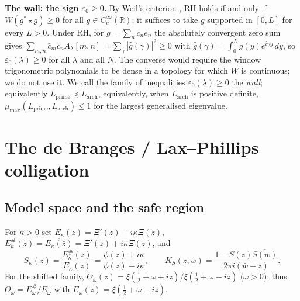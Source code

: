 \documentclass[11pt]{amsart}
\theoremstyle{definition}
\theoremstyle{remark}
\newcommand{\half}{\tfrac{1}{2}}
\newcommand{\om}{\omega}
\newcommand{\kap}{\kappa}
\newcommand{\eps}{\varepsilon}
\newcommand{\R}{\mathbb{R}}
\newcommand{\Xibar}{\Xi}
\newcommand{\Th}{\Theta}
\newcommand{\Sk}{S_\kap}
\newcommand{\Ek}{E_\kap}
\begin{document}
\medskip\noindent\textbf{The wall: the sign $\eps_0\ge0$.}
By Weil's criterion \cite{Weil,Bombieri}, RH holds if and only if $W(g^*\star g)\ge0$ for all
$g\in C_c^\infty(\R)$; it suffices to take $g$ supported in $[0,L]$ for every $L>0$. Under RH, for $g=\sum_nc_ne_n$ the absolutely convergent zero sum gives
$\sum_{m,n}\bar c_mc_nA_\lambda[m,n]=\sum_\gamma|\hat g(\gamma)|^2\ge0$ with
$\hat g(\gamma)=\int_0^Lg(y)e^{i\gamma y}\,dy$, so $\eps_0(\lambda)\ge0$ for all $\lambda$ and all $N$. The converse would require the
window trigonometric polynomials to be dense in a topology for which $W$ is continuous; we do not
use it. We call the family of inequalities $\eps_0(\lambda)\ge0$ the \emph{wall}; equivalently
$L_{\mathrm{prime}}\preceq L_{\mathrm{arch}}$, equivalently, when
$L_{\mathrm{arch}}$ is positive definite,
$\mu_{\max}(L_{\mathrm{prime}},L_{\mathrm{arch}})\le1$ for the largest generalised eigenvalue.
\medskip

\section{The de Branges / Lax--Phillips colligation}

\subsection{Model space and the safe region}
For $\kap>0$ set $\Ek(z)=\Xibar'(z)-i\kap\Xibar(z)$, $\Ek^\#(z)=\overline{\Ek(\bar z)}
=\Xibar'(z)+i\kap\Xibar(z)$, and
\[
   \Sk(z)=\frac{\Ek^\#(z)}{\Ek(z)}=\frac{\phi(z)+i\kap}{\phi(z)-i\kap},\qquad
   K_S(z,w)=\frac{1-S(z)\overline{S(w)}}{2\pi i(\bar w-z)} .
\]
For the shifted family, $\Th_\om(z)=\xi(\half+\om+iz)/\xi(\half+\om-iz)$ ($\om>0$); thus
$\Th_\om=E_\om^\#/E_\om$ with $E_\om(z)=\xi(\half+\om-iz)$.
\end{document}
